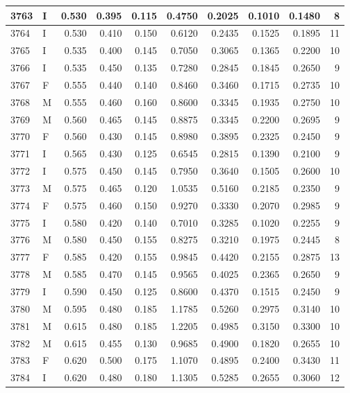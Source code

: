 \documentclass[9pt,twocolumn,twoside,]{pnas-new}
\begin{document}
\begin{tabular}{l|l|r|r|r|r|r|r|r|r}
\hline
3763 & I & 0.530 & 0.395 & 0.115 & 0.4750 & 0.2025 & 0.1010 & 0.1480 & 8\\
\hline
3764 & I & 0.530 & 0.410 & 0.150 & 0.6120 & 0.2435 & 0.1525 & 0.1895 & 11\\
\hline
3765 & I & 0.535 & 0.400 & 0.145 & 0.7050 & 0.3065 & 0.1365 & 0.2200 & 10\\
\hline
3766 & I & 0.535 & 0.450 & 0.135 & 0.7280 & 0.2845 & 0.1845 & 0.2650 & 9\\
\hline
3767 & F & 0.555 & 0.440 & 0.140 & 0.8460 & 0.3460 & 0.1715 & 0.2735 & 10\\
\hline
3768 & M & 0.555 & 0.460 & 0.160 & 0.8600 & 0.3345 & 0.1935 & 0.2750 & 10\\
\hline
3769 & M & 0.560 & 0.465 & 0.145 & 0.8875 & 0.3345 & 0.2200 & 0.2695 & 9\\
\hline
3770 & F & 0.560 & 0.430 & 0.145 & 0.8980 & 0.3895 & 0.2325 & 0.2450 & 9\\
\hline
3771 & I & 0.565 & 0.430 & 0.125 & 0.6545 & 0.2815 & 0.1390 & 0.2100 & 9\\
\hline
3772 & I & 0.575 & 0.450 & 0.145 & 0.7950 & 0.3640 & 0.1505 & 0.2600 & 10\\
\hline
3773 & M & 0.575 & 0.465 & 0.120 & 1.0535 & 0.5160 & 0.2185 & 0.2350 & 9\\
\hline
3774 & F & 0.575 & 0.460 & 0.150 & 0.9270 & 0.3330 & 0.2070 & 0.2985 & 9\\
\hline
3775 & I & 0.580 & 0.420 & 0.140 & 0.7010 & 0.3285 & 0.1020 & 0.2255 & 9\\
\hline
3776 & M & 0.580 & 0.450 & 0.155 & 0.8275 & 0.3210 & 0.1975 & 0.2445 & 8\\
\hline
3777 & F & 0.585 & 0.420 & 0.155 & 0.9845 & 0.4420 & 0.2155 & 0.2875 & 13\\
\hline
3778 & M & 0.585 & 0.470 & 0.145 & 0.9565 & 0.4025 & 0.2365 & 0.2650 & 9\\
\hline
3779 & I & 0.590 & 0.450 & 0.125 & 0.8600 & 0.4370 & 0.1515 & 0.2450 & 9\\
\hline
3780 & M & 0.595 & 0.480 & 0.185 & 1.1785 & 0.5260 & 0.2975 & 0.3140 & 10\\
\hline
3781 & M & 0.615 & 0.480 & 0.185 & 1.2205 & 0.4985 & 0.3150 & 0.3300 & 10\\
\hline
3782 & M & 0.615 & 0.455 & 0.130 & 0.9685 & 0.4900 & 0.1820 & 0.2655 & 10\\
\hline
3783 & F & 0.620 & 0.500 & 0.175 & 1.1070 & 0.4895 & 0.2400 & 0.3430 & 11\\
\hline
3784 & I & 0.620 & 0.480 & 0.180 & 1.1305 & 0.5285 & 0.2655 & 0.3060 & 12\\

\end{tabular}
\end{document}
